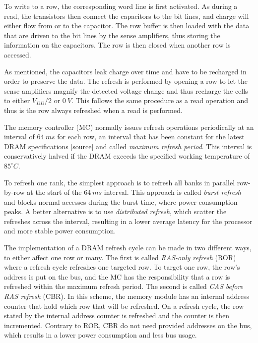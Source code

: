 To write to a row, the corresponding word line is first activated. As during a read, the transistors then connect the capacitors to the bit lines, and charge will either flow from or to the capacitor. The row buffer is then loaded with the data that are driven to the bit lines by the sense amplifiers, thus storing the information on the capacitors. The row is then closed when another row is accessed.

As mentioned, the capacitors leak charge over time and have to be recharged in order to preserve the data. The refresh is performed by opening a row to let the sense amplifiers magnify the detected voltage change and thus recharge the cells to either $V_{DD}/2$ or $0\:V$. This follows the same procedure as a read operation and thus is the row always refreshed when a read is performed. %

The memory controller (MC) normally issues refresh operations periodically at an interval of $64\:ms$ for each row, an interval that has been constant for the latest DRAM specifications [source] and called \textit{maximum refresh period}. This interval is conservatively halved if the DRAM exceeds the specified working temperature of $85^{\circ}C$. 

To refresh one rank, the simplest approach is to refresh all banks in parallel row-by-row at the start of the $64\:ms$ interval. This approach is called \textit{burst refresh} and blocks normal accesses during the burst time, where power consumption peaks. A better alternative is to use \textit{distributed refresh}, which scatter the refreshes across the interval, resulting in a lower average latency for the processor and more stable power consumption.

The implementation of a DRAM refresh cycle can be made in two different ways, to either affect one row or many. The first is called \textit{RAS-only refresh} (ROR) where a refresh cycle refreshes one targeted row. To target one row, the row's address is put on the bus, and the MC has the responsibility that a row is refreshed within the maximum refresh period. The second is called \textit{CAS before RAS refresh} (CBR). In this scheme, the memory module has an internal address counter that hold which row that will be refreshed. On a refresh cycle, the row stated by the internal address counter is refreshed and the counter is then incremented. Contrary to ROR, CBR do not need provided addresses on the bus, which results in a lower power consumption and less bus usage. %

